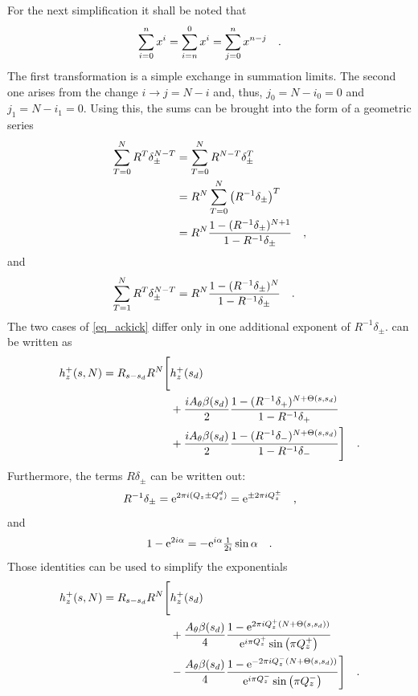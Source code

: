%
For the next simplification it shall be noted that
%
\begin{equation}
    \sum\limits_{i=0}^n x^i = \sum\limits_{i=n}^0 x^i = \sum\limits_{j=0}^{n} x^{n-j}
    \quad .
\end{equation}
%
The first transformation is a simple exchange in summation limits. The second one arises from the
change $i\rightarrow j=N-i$ and, thus, $j_0 = N-i_0 = 0$ and $j_1 = N - i_1 = 0$.
Using this, the sums can be brought into the form of a geometric series
%
\begin{align}
    \sum\limits_{T=0}^N R^T\delta_\pm^{N-T}
    &= \sum\limits_{T=0}^N R^{N-T}\delta_\pm^{T} \notag \\
    &=  R ^N \sum\limits_{T=0}^N \left( R^{-1}\delta_\pm \right)^{T} \notag \\
    &=  R ^N \frac{1- (R^{-1}\delta_\pm)^{N+1}}{1 - R^{-1}\delta_\pm}
    \quad ,
\end{align}
%
and
%
\begin{align}
    \sum\limits_{T=1}^N R^T\delta_\pm^{N-T}
    &= R^N \frac{1- (R^{-1}\delta_\pm)^{N}}{1 - R^{-1}\delta_\pm}
    \quad .
\end{align}
%
The two cases of \eqref{eq_ackick} differ only in one additional exponent of $R^{-1}\delta_\pm$.
 can be written as
%
\begin{align}
    h_z^+(s, N) = R_{s-s_d}R^N 
    \Bigg[&h_z^+(s_d)  \notag \\
        &+ \frac{iA_\theta\beta(s_d)}{2}\frac{1-(R^{-1}\delta_+)^{N+\Theta(s,s_d)}}{1-R^{-1}\delta_+}  \notag \\
        &+ \frac{iA_\theta\beta(s_d)}{2}\frac{1-(R^{-1}\delta_-)^{N+\Theta(s,s_d)}}{1-R^{-1}\delta_-}
    \Bigg]
    \quad .
\end{align}
%
Furthermore, the terms $R\delta_\pm$ can be written out:
%
\begin{equation}
    R^{-1}\delta_\pm = \text{e}^{2\pi i (Q_z \pm Q^{d}_{z})} = \text{e}^{\pm 2\pi i Q_z^\pm}
    \quad ,
\end{equation}
%
and
%
\begin{equation}
    1 - \text{e}^{2i\alpha} = -\text{e}^{i\alpha}\tfrac{1}{2i} \sin\alpha
    \quad .
\end{equation}
%
Those identities can be used to simplify the exponentials
%
\begin{align}
    h_z^+(s, N) = R_{s-s_d}R^N 
    \Bigg[&h_z^+(s_d)  \notag \\
        &+ \frac{A_\theta\beta(s_d)}{4}\frac{1-\text{e}^{2\pi i Q_z^+(N+\Theta(s,s_d))}}{\text{e}^{i\pi Q_z^+}\sin\left( \pi Q_z^+ \right)}  \notag \\
        &- \frac{A_\theta\beta(s_d)}{4}\frac{1-\text{e}^{-2\pi i Q_z^-(N+\Theta(s,s_d))}}{\text{e}^{i\pi Q_z^-}\sin\left( \pi Q_z^- \right)}
    \Bigg]
    \quad .
    \label{eq_delta_written_out}
\end{align}
